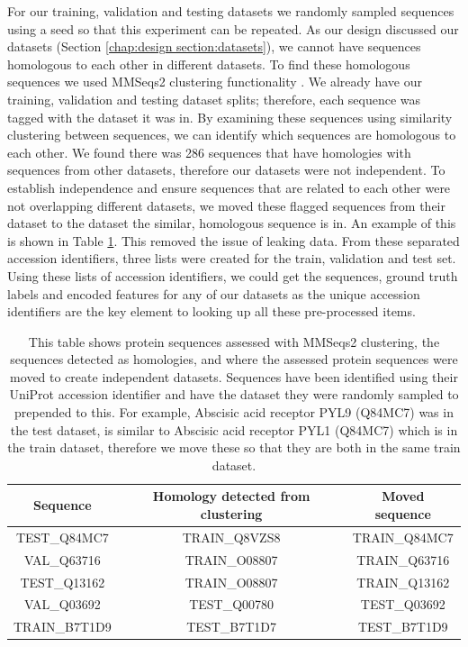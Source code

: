 \documentclass{l4proj}
\begin{document}
For our training, validation and testing datasets we randomly sampled sequences using a seed so that this experiment can be repeated. As our design discussed our datasets (Section \ref{chap:design section:datasets}), we cannot have sequences homologous to each other in different datasets. To find these homologous sequences we used MMSeqs2 clustering functionality \citep{Steinegger:17}. We already have our training, validation and testing dataset splits; therefore, each sequence was tagged with the dataset it was in. By examining these sequences using similarity clustering between sequences, we can identify which sequences are homologous to each other. We found there was 286 sequences that have homologies with sequences from other datasets, therefore our datasets were not independent. To establish independence and ensure sequences that are related to each other were not overlapping different datasets, we moved these flagged sequences from their dataset to the dataset the similar, homologous sequence is in. An example of this is shown in Table \ref{tab:MMSeqs clustering}. This removed the issue of leaking data. From these separated accession identifiers, three lists were created for the train, validation and test set. Using these lists of accession identifiers, we could get the sequences, ground truth labels and encoded features for any of our datasets as the unique accession identifiers are the key element to looking up all these pre-processed items.

\begin{table}[!ht]
    \centering
    \caption{This table shows protein sequences assessed with MMSeqs2 clustering, the sequences detected as homologies, and where the assessed protein sequences were moved to create independent datasets. Sequences have been identified using their UniProt accession identifier and have the dataset they were randomly sampled to prepended to this. For example, Abscisic acid receptor PYL9 (Q84MC7) was in the test dataset, is similar to Abscisic acid receptor PYL1 (Q84MC7) which is in the train dataset, therefore we move these so that they are both in the same train dataset.}
    \begin{tabular}{|c|c|c|}
        \hline
        Sequence & Homology detected from clustering & Moved sequence \\ \hline
        TEST\_Q84MC7 & TRAIN\_Q8VZS8 & TRAIN\_Q84MC7 \\ \hline
        VAL\_Q63716 & TRAIN\_O08807 & TRAIN\_Q63716 \\ \hline
        TEST\_Q13162 & TRAIN\_O08807 & TRAIN\_Q13162 \\ \hline
        VAL\_Q03692 & TEST\_Q00780 & TEST\_Q03692 \\ \hline
        TRAIN\_B7T1D9 & TEST\_B7T1D7 & TEST\_B7T1D9 \\ \hline
    \end{tabular}  

    \label{tab:MMSeqs clustering} 
\end{table}
\end{document}
